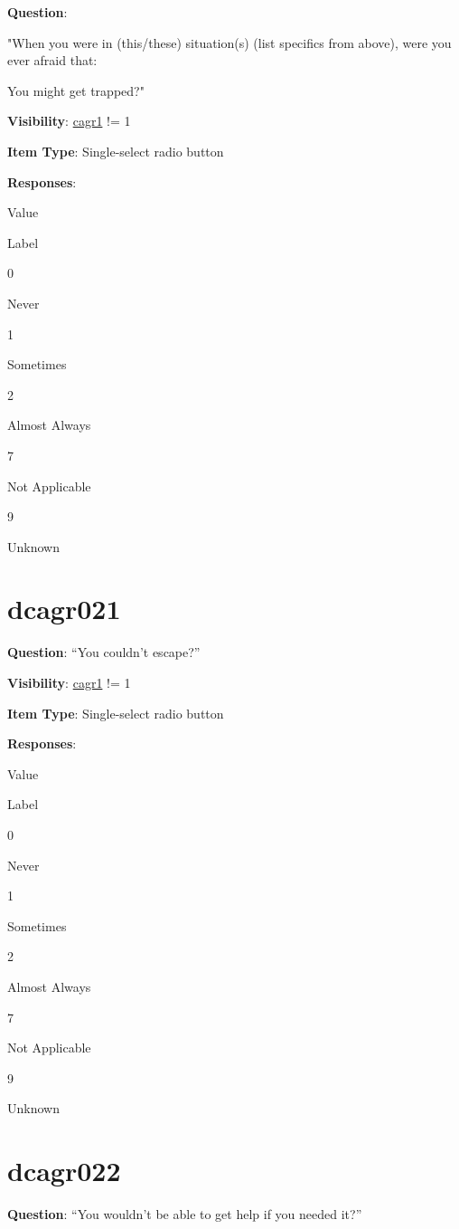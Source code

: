\documentclass[]{book}
\begin{document}
\textbf{Question}:

"When you were in (this/these) situation(s) (list specifics from above), were you ever afraid that:

You might get trapped?"

\textbf{Visibility}: \protect\hyperlink{cagr1}{cagr1} != 1

\textbf{Item Type}: Single-select radio button

\textbf{Responses}:

Value

Label

0

Never

1

Sometimes

2

Almost Always

7

Not Applicable

9

Unknown

\hypertarget{dcagr021}{%
\section{dcagr021}\label{dcagr021}}

\textbf{Question}: ``You couldn't escape?''

\textbf{Visibility}: \protect\hyperlink{cagr1}{cagr1} != 1

\textbf{Item Type}: Single-select radio button

\textbf{Responses}:

Value

Label

0

Never

1

Sometimes

2

Almost Always

7

Not Applicable

9

Unknown

\hypertarget{dcagr022}{%
\section{dcagr022}\label{dcagr022}}

\textbf{Question}: ``You wouldn't be able to get help if you needed it?''
\end{document}
